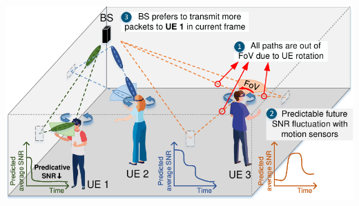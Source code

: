 \documentclass[paperwidth=46.8in,paperheight=26.3in,fontscale=0.35]{baposter}
\begin{document}
\begin{poster}
{\begin{minipage}{0.43\linewidth}
            \begin{center}
                \includegraphics[width=\textwidth]{fig/pre_motivation_scenario_predict_v1_2.pdf}
            \end{center}
        \end{minipage}
    }


\end{poster}
\end{document}
